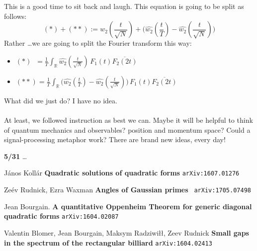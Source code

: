 \documentclass[12pt]{article}
\begin{document}
This is a good time to sit back and laugh.  This equation is going to be split as follows:
$$ (\ast) + (\ast \ast) := \widehat{w_2}(\frac{t}{\sqrt{N}})  + \big( \widehat{w_2}(\frac{t}{T})  - \widehat{w_2}(\frac{t}{\sqrt{N}}) \big) $$
Rather \dots we are going to split the Fourier transform this way:
\begin{itemize}
\item $(\ast) \;\;= \frac{1}{T} \int_\mathbb{R} \widehat{w_2}(\frac{t}{\sqrt{N}}) \, F_1(t) \overline{F_2(2t)}$
\item $(\ast \ast) = \frac{1}{T} \int_\mathbb{R} 
\Big(\widehat{w_2}(\frac{t}{T}) - \widehat{w_2}(\frac{t}{\sqrt{N}}) \Big)
 \, F_1(t) \overline{F_2(2t)}$
\end{itemize}
What did we just do?  I have no idea.  \\ \\
At least, we followed instruction as best we can.  Maybe it will be helpful to think of quantum mechanics and observables?  position and momentum space?  Could a signal-processing metaphor work?  There are brand new ideas, every day!

\newpage

\noindent \textbf{5/31} \dots 

\newpage

\begin{thebibliography}{}

\item J\'{a}nos Koll\'{a}r \textbf{Quadratic solutions of quadratic forms} \texttt{arXiv:1607.01276}

\item Ze\'{e}v Rudnick, Ezra Waxman  \textbf{Angles of Gaussian primes} \texttt{ arXiv:1705.07498}

\item Jean Bourgain. \textbf{A quantitative Oppenheim Theorem for generic diagonal quadratic forms} \texttt{arXiv:1604.02087}

\item Valentin Blomer, Jean Bourgain, Maksym Radziwi\l\l, Zeev Rudnick   \textbf{Small gaps in the spectrum of the rectangular billiard} \texttt{arXiv:1604.02413}


\end{thebibliography}



\vfill
\end{document}
